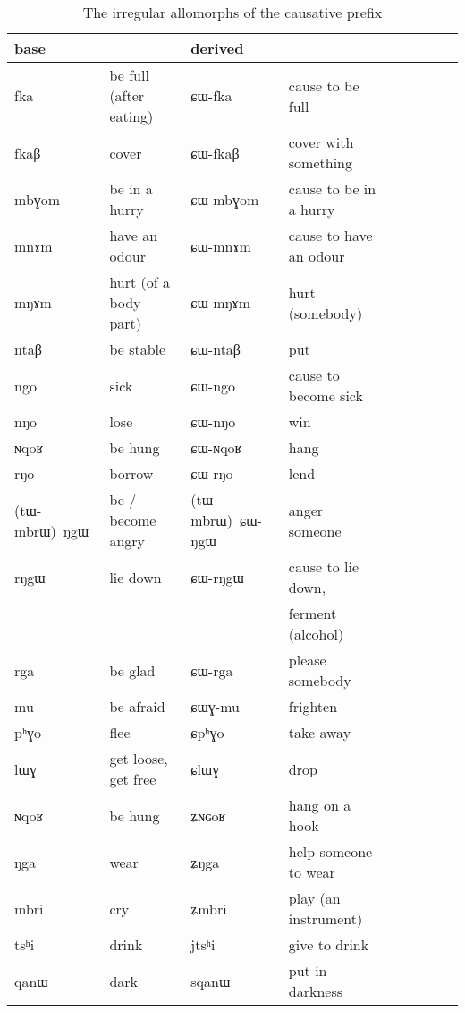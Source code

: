 \documentclass[oldfontcommands,oneside,a4paper,11pt]{article}
\newcommand{\ipa}[1]{{\phon \mbox{#1}}} %
\newcommand{\jg}[1]{\ipa{#1}\index{Japhug #1}}
\begin{document}
\begin{table}[h]
\caption{The irregular allomorphs of the causative prefix}\label{tab:causative.irregular} \centering
\begin{tabular}{lllllllll} \toprule
  base & & derived & \\
 \midrule
\jg{fka}  &  be full (after eating) &  \jg{ɕɯ-fka}  &  cause to be full  \\ 
\jg{fkaβ}  &  cover &  \jg{ɕɯ-fkaβ}  &  cover with  something \\ 
\jg{mbɣom}  &  be in a hurry &  \jg{ɕɯ-mbɣom}  & cause to be in a hurry \\ 
\jg{mnɤm}  &  have an odour &  \jg{ɕɯ-mnɤm}  & cause to have an odour \\ 
\jg{mŋɤm}  &   hurt  (of a body part) &  \jg{ɕɯ-mŋɤm}  & hurt (somebody)   \\ 
\jg{ntaβ}  & be stable  &  \jg{ɕɯ-ntaβ}  & put      \\ 
\jg{ngo}  & sick   &  \jg{ɕɯ-ngo}  & cause to become sick  \\ 
\jg{nŋo}  & lose   &  \jg{ɕɯ-nŋo}  & win   \\ 
\jg{ɴqoʁ}  & be hung  &  \jg{ɕɯ-ɴqoʁ}  & hang   \\ 
\jg{rŋo}  & borrow  &  \jg{ɕɯ-rŋo}  & lend     \\ 
\jg{(tɯ-mbrɯ) ŋgɯ}  & be / become angry  &  \jg{(tɯ-mbrɯ) ɕɯ-ŋgɯ}  & anger someone     \\ 
\jg{rŋgɯ}  & lie down  &  \jg{ɕɯ-rŋgɯ}  & cause to lie down, \\
&&&ferment (alcohol)   \\ 
\jg{rga}  & be glad  &  \jg{ɕɯ-rga}  &  please somebody  \\ 
\midrule
\jg{mu}  & be afraid  &  \jg{ɕɯɣ-mu}  & frighten   \\ 
\midrule
\jg{pʰɣo}  &  flee  &  \jg{ɕpʰɣo}  &  take away     \\ 
\jg{lɯɣ}  &  get loose, get free  &  \jg{ɕlɯɣ}  &  drop   \\ 
\midrule
\jg{ɴqoʁ}  & be hung&  \jg{ʑɴɢoʁ}  & hang on a hook  \\ 
\jg{ŋga}  & wear  &  \jg{ʑŋga}  & help someone to wear  \\ 
\jg{mbri}  & cry    &  \jg{ʑmbri}  & play (an instrument) \\ 
\midrule
\jg{tsʰi}  & drink   &  \jg{jtsʰi}  & give to drink  \\ 
\midrule
\jg{qanɯ}  & dark   &  \jg{sqanɯ}  & put in darkness  \\ 
 \bottomrule
\end{tabular}
\end{table}
\end{document}
